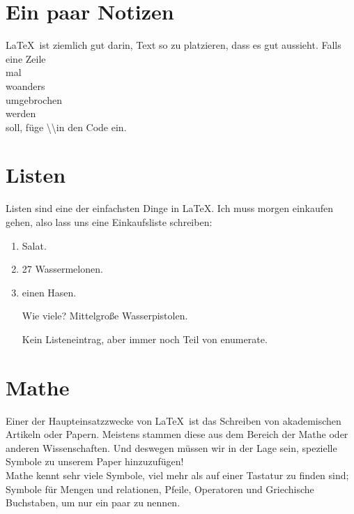 \documentclass[12pt]{article}
\begin{document}
\section{Ein paar Notizen}
\LaTeX\ ist ziemlich gut darin, Text so zu platzieren, dass es gut aussieht.
Falls eine Zeile \\ mal \\ woanders \\ umgebrochen \\ werden \\ soll, füge
\textbackslash\textbackslash in den Code ein.\\

\section{Listen}
Listen sind eine der einfachsten Dinge in \LaTeX. Ich muss morgen einkaufen gehen,
also lass uns eine Einkaufsliste schreiben:
\begin{enumerate} %
  \item Salat.
  \item 27 Wassermelonen.
  \item einen Hasen.
  \item[Wie viele?] Mittelgroße Wasserpistolen.

  Kein Listeneintrag, aber immer noch Teil von enumerate.

\end{enumerate} %

\section{Mathe}

Einer der Haupteinsatzzwecke von \LaTeX\ ist das Schreiben von akademischen
Artikeln oder Papern. Meistens stammen diese aus dem Bereich der Mathe oder
anderen Wissenschaften. Und deswegen müssen wir in der Lage sein, spezielle
Symbole zu unserem Paper hinzuzufügen! \\

Mathe kennt sehr viele Symbole, viel mehr als auf einer Tastatur zu finden sind;
Symbole für Mengen und relationen, Pfeile, Operatoren und Griechische Buchstaben,
um nur ein paar zu nennen.\\
\end{document}
